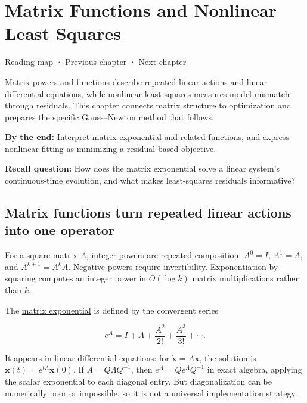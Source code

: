 \chapter{Matrix Functions and Nonlinear Least Squares}\label{02-foundations-ii-ch026-matrix-functions-and-nonlinear-least-squares}\hypertarget{02-foundations-ii-ch026}{}\label{stagechapter:02-foundations-ii-ch026}

\hyperref[volume-reading-map]{Reading map} · \hyperref[02-foundations-ii-ch025-continuous-models-and-numerical-error]{Previous chapter} · \hyperref[02-foundations-ii-ch027-gaussnewton-for-geometry-and-pose]{Next chapter}

Matrix powers and functions describe repeated linear actions and linear differential equations, while nonlinear least squares measures model mismatch through residuals. This chapter connects matrix structure to optimization and prepares the specific Gauss--Newton method that follows.

\textbf{By the end:} Interpret matrix exponential and related functions, and express nonlinear fitting as minimizing a residual-based objective.

\textbf{Recall question:} How does the matrix exponential solve a linear system's continuous-time evolution, and what makes least-squares residuals informative?

\section{Matrix functions turn repeated linear actions into one operator}\label{02-foundations-ii-ch026-matrix-functions-turn-repeated-linear-actions-into-one-operator}

For a square matrix \(A\), integer powers are repeated composition: \(A^0=I\), \(A^1=A\), and \(A^{k+1}=A^kA\). Negative powers require invertibility. Exponentiation by squaring computes an integer power in \(O(\log k)\) matrix multiplications rather than \(k\).

The \hyperref[02-foundations-ii-ch026-matrix-functions-turn-repeated-linear-actions-into-one-operator]{matrix exponential} is defined by the convergent series

\[
e^A=I+A+\frac{A^2}{2!}+\frac{A^3}{3!}+\cdots.
\]

It appears in linear differential equations: for \(\dot{\mathbf x}=A\mathbf x\), the solution is \(\mathbf x(t)=e^{tA}\mathbf x(0)\). If \(A=Q\Lambda Q^{-1}\), then \(e^A=Qe^\Lambda Q^{-1}\) in exact algebra, applying the scalar exponential to each diagonal entry. But diagonalization can be numerically poor or impossible, so it is not a universal implementation strategy.

